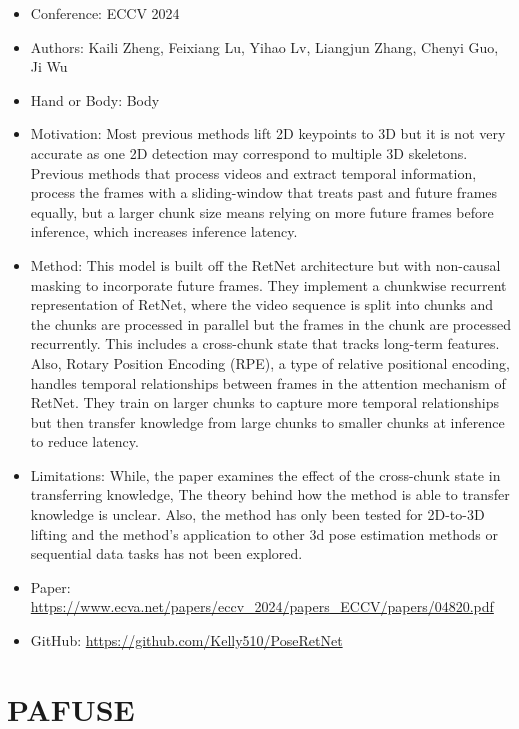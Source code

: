 \documentclass{article}
\begin{document}
\begin{itemize}
    \item Conference: ECCV 2024
    \item Authors: Kaili Zheng, Feixiang Lu, Yihao Lv, Liangjun Zhang, Chenyi Guo, Ji Wu
    \item Hand or Body: Body
    \item Motivation: Most previous methods lift 2D keypoints to 3D but it is not very accurate as one 2D detection may correspond to multiple 3D skeletons. Previous methods that process videos and extract temporal information, process the frames with a sliding-window that treats past and future frames equally, but a larger chunk size means relying on more future frames before inference, which increases inference latency.
    \item Method: This model is built off the RetNet architecture but with non-causal masking to incorporate future frames. They implement a chunkwise recurrent representation of RetNet, where the video sequence is split into chunks and the chunks are processed in parallel but the frames in the chunk are processed recurrently. This includes a cross-chunk state that tracks long-term features. Also, Rotary Position Encoding (RPE), a type of relative positional encoding, handles temporal relationships between frames in the attention mechanism of RetNet. They train on larger chunks to capture more temporal relationships but then transfer knowledge from large chunks to smaller chunks at inference to reduce latency.
    \item Limitations: While, the paper examines the effect of the cross-chunk state in transferring knowledge, The theory behind how the method is able to transfer knowledge is unclear. Also, the method has only been tested for 2D-to-3D lifting and the method's application to other 3d pose estimation methods or sequential data tasks has not been explored.
    \item Paper: \url{https://www.ecva.net/papers/eccv_2024/papers_ECCV/papers/04820.pdf}
    \item GitHub: \url{https://github.com/Kelly510/PoseRetNet}
\end{itemize}

\section*{PAFUSE}
\end{document}
